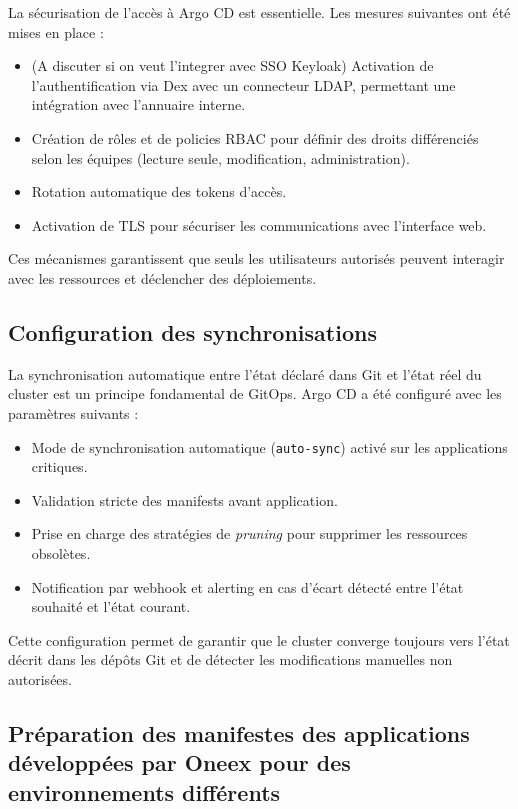 La sécurisation de l’accès à Argo CD est essentielle.
Les mesures suivantes ont été mises en place :
\begin{itemize}
	\item (A discuter si on veut l'integrer avec SSO Keyloak) Activation de l’authentification via Dex avec un connecteur LDAP, permettant une intégration avec l’annuaire interne.
	\item Création de rôles et de policies RBAC pour définir des droits différenciés selon les équipes (lecture seule, modification, administration).
	\item Rotation automatique des tokens d’accès.
	\item Activation de TLS pour sécuriser les communications avec l’interface web.
\end{itemize}

Ces mécanismes garantissent que seuls les utilisateurs autorisés peuvent interagir avec les ressources et déclencher des déploiements.

\subsection{Configuration des synchronisations}

La synchronisation automatique entre l’état déclaré dans Git et l’état réel du cluster est un principe fondamental de GitOps.
Argo CD a été configuré avec les paramètres suivants :
\begin{itemize}
	\item Mode de synchronisation automatique (\texttt{auto-sync}) activé sur les applications critiques.
	\item Validation stricte des manifests avant application.
	\item Prise en charge des stratégies de \textit{pruning} pour supprimer les ressources obsolètes.
	\item Notification par webhook et alerting en cas d’écart détecté entre l’état souhaité et l’état courant.
\end{itemize}

Cette configuration permet de garantir que le cluster converge toujours vers l’état décrit dans les dépôts Git et de détecter les modifications manuelles non autorisées.

\subsection{Préparation des manifestes des applications développées par Oneex pour des environnements différents}


